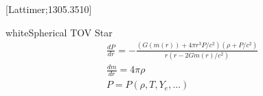 {\begin{columns}
\begin{column}{.48\textwidth}
    \centering \tiny [Lattimer;1305.3510]
\vspace{.05cm}
 \\


\begin{mybox}{white}{\centering \scriptsize Spherical TOV Star}
\vspace{-.3cm}
\tiny    \begin{equation*}
      \label{eq:1}
      \begin{split}
        &\frac{dP}{dr} = -\frac{(G(m(r)) + 4\pi r^{3}P/c^{2})(\rho + P/c^{2})}{r(r-2Gm(r)/c^{2})} \\
& \frac{dm}{dr} = 4\pi\rho \\
&P = P(\rho, T, Y_{e}, ...)
      \end{split}
    \end{equation*}   
\end{mybox}
  \end{column}
\end{columns}
}




